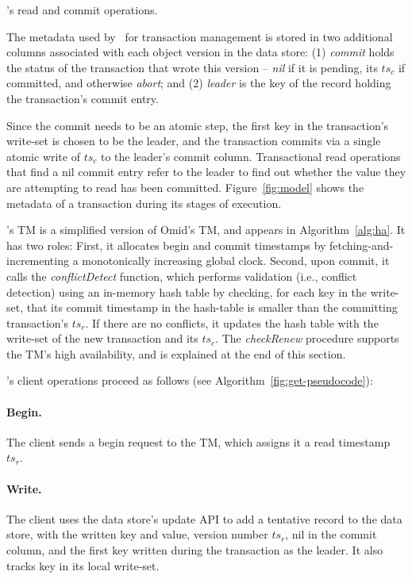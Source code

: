 \begin{algorithm}[t]
\begin{algorithmic}
  \end{algorithmic}
  \caption{\sys's read and commit operations.} 
  \label{fig:get-pseudocode}
\end{algorithm} 



The metadata used by \sys\ for transaction management is stored in two additional columns associated with each object version in the data store:
(1) \emph{commit} holds the status of the transaction that wrote this version -- \emph{nil} if it is pending, its  $ts_c$ if committed, and 
otherwise \emph{abort}; 
and
(2) \emph{leader} is the key of the record holding the transaction's commit entry.

Since the commit needs to be an atomic step, the first key in the transaction's write-set is chosen to be the leader, and the transaction commits via a single atomic write of $ts_c$ to the leader's commit column. Transactional read operations that find a nil commit entry 
refer to the leader to find out whether the value they are attempting to read has been committed.
Figure~\ref{fig:model} shows the metadata of a transaction during its stages of execution. 

\sys's TM is a simplified version of Omid's TM, and appears  in Algorithm~\ref{alg:ha}. It has two roles:
First, it allocates begin and commit timestamps by fetching-and-incrementing a monotonically increasing global clock.
Second, upon commit, it calls the \emph{conflictDetect} function, which 
performs validation (i.e., conflict detection) using an in-memory hash table
by checking, for each key in the write-set, that its commit timestamp in the hash-table is smaller than the 
committing transaction's $ts_r$. If there are no conflicts, it 
updates the hash table with the write-set of the new transaction and its $ts_c$. 
The  \emph{checkRenew} procedure supports the TM's  high availability, and is explained at the end of this section.

\sys's client operations proceed as follows (see Algorithm~\ref{fig:get-pseudocode}):

\paragraph{Begin.}
The client sends a begin request to the TM, which assigns it a read timestamp $ts_r$.

\paragraph{Write.}
The client uses the data store's update API to add a tentative record to the data store, with the written key and value, 
version number $ts_r$, nil in the commit column, and the first key written during the transaction as the leader.
It also tracks key in its local write-set.


